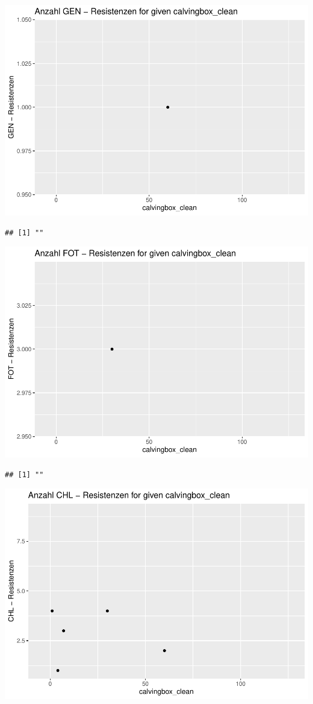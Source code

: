 \documentclass[
]{article}
\begin{document}
\includegraphics{NResistenzen_files/figure-latex/numerical_variables-24.pdf}

\begin{verbatim}
## [1] ""
\end{verbatim}

\includegraphics{NResistenzen_files/figure-latex/numerical_variables-25.pdf}

\begin{verbatim}
## [1] ""
\end{verbatim}

\includegraphics{NResistenzen_files/figure-latex/numerical_variables-26.pdf}
\end{document}
